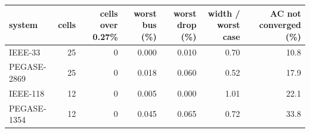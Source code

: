 \begin{tabular}{lrrrrrr}
\toprule
system & cells & cells over 0.27\% & worst bus (\%) & worst drop (\%) & width / worst case & AC not converged (\%) \\
\midrule
IEEE-33 & 25 & 0 & 0.000 & 0.010 & 0.70 & 10.8 \\
PEGASE-2869 & 25 & 0 & 0.018 & 0.060 & 0.52 & 17.9 \\
IEEE-118 & 12 & 0 & 0.005 & 0.000 & 1.01 & 22.1 \\
PEGASE-1354 & 12 & 0 & 0.045 & 0.065 & 0.72 & 33.8 \\
\bottomrule
\end{tabular}
